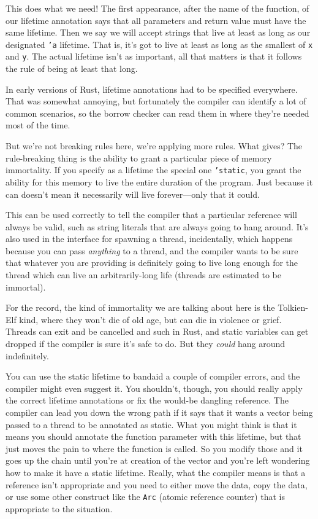 \documentclass[a4paper]{report}
\begin{document}
This does what we need! The first appearance, after the name of the function, of our lifetime annotation says that all parameters and return value must have the same lifetime. Then we say we will accept strings that live at least as long as our designated \texttt{'a} lifetime. That is, it's got to live at least as long as the smallest of \texttt{x} and \texttt{y}. The actual lifetime isn't as important, all that matters is that it follows the rule of being at least that long.

In early versions of Rust, lifetime annotations had to be specified everywhere. That was somewhat annoying, but fortunately the compiler can identify a lot of common scenarios, so the borrow checker can read them in where they're needed most of the time.


But we're not breaking rules here, we're applying more rules. What gives? The rule-breaking thing is the ability to grant a particular piece of memory immortality. If you specify as a lifetime the special one \texttt{'static}, you grant the ability for this memory to live the entire duration of the program. Just because it can doesn't mean it necessarily will live forever---only that it could. 

This can be used correctly to tell the compiler that a particular reference will always be valid, such as string literals that are always going to hang around. It's also used in the interface for spawning a thread, incidentally, which happens because you can pass \textit{anything} to a thread, and the compiler wants to be sure that whatever you are providing is definitely going to live long enough for the thread which can live an arbitrarily-long life (threads are estimated to be immortal). 

For the record, the kind of immortality we are talking about here is the Tolkien-Elf kind, where they won't die of old age, but can die in violence or grief. Threads can exit and be cancelled and such in Rust, and static variables can get dropped if the compiler is sure it's safe to do. But they \textit{could} hang around indefinitely.

You can use the static lifetime to bandaid a couple of compiler errors, and the compiler might even suggest it. You shouldn't, though, you should really apply the correct lifetime annotations or fix the would-be dangling reference. The compiler can lead you down the wrong path if it says that it wants a vector being passed to a thread to be annotated as static. What you might think is that it means you should annotate the function parameter with this lifetime, but that just moves the pain to where the function is called. So you modify those and it goes up the chain until you're at creation of the vector and you're left wondering how to make it have a static lifetime. Really, what the compiler means is that a reference isn't appropriate and you need to either move the data, copy the data, or use some other construct like the \texttt{Arc} (atomic reference counter) that is appropriate to the situation. 
\end{document}
